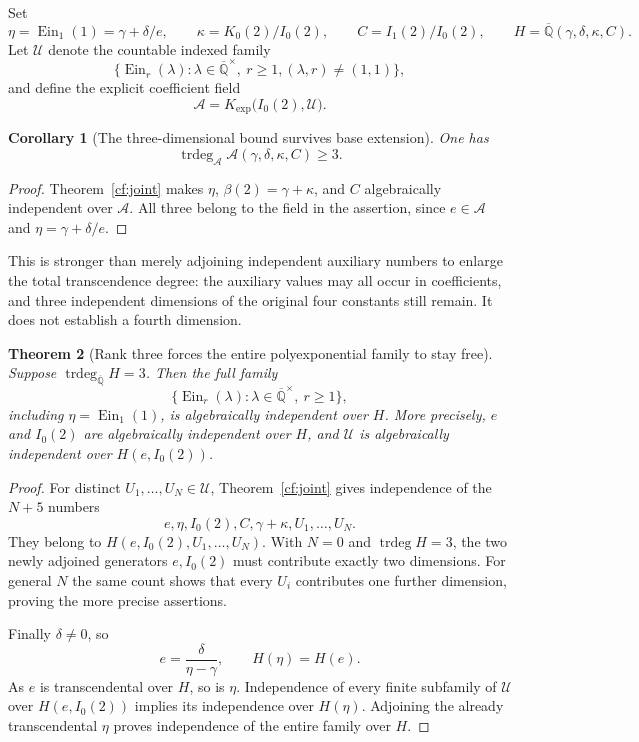 \documentclass[11pt]{article}
\newtheorem{theorem}{Theorem}[section]
\newtheorem{corollary}[theorem]{Corollary}
\theoremstyle{definition}
\theoremstyle{remark}
\newcommand{\Ein}{\operatorname{Ein}}
\begin{document}
Set
\[
 \eta=\Ein_1(1)=\gamma+\delta/e,\qquad
 \kappa=K_0(2)/I_0(2),\qquad C=I_1(2)/I_0(2),\qquad
 H=\overline{\mathbb Q}(\gamma,\delta,\kappa,C).
\]
Let $\mathcal U$ denote the countable indexed family
\[
 \{\Ein_r(\lambda):\lambda\in\overline{\mathbb Q}^{\times},\ r\ge1,
                         (\lambda,r)\ne(1,1)\},
\]
and define the explicit coefficient field
\[
 \mathcal A=K_{\exp}\bigl(I_0(2),\mathcal U\bigr).
\]
\begin{corollary}[The three-dimensional bound survives base extension]
\label{pj:largebase}
One has
\[
 \operatorname{trdeg}_{\mathcal A}
 \mathcal A(\gamma,\delta,\kappa,C)\ge3.
\]
\end{corollary}
\begin{proof}
Theorem~\ref{cf:joint} makes $\eta$, $\beta(2)=\gamma+\kappa$, and
$C$ algebraically independent over $\mathcal A$. All three belong to
the field in the assertion, since $e\in\mathcal A$ and
$\eta=\gamma+\delta/e$.
\end{proof}
This is stronger than merely adjoining independent auxiliary numbers
to enlarge the total transcendence degree: the auxiliary values may
all occur in coefficients, and three independent dimensions of the
original four constants still remain. It does not establish a fourth
dimension.

\begin{theorem}[Rank three forces the entire polyexponential family to stay free]
\label{pj:rankthree}
Suppose $\operatorname{trdeg}_{\overline{\mathbb Q}}H=3$. Then the full
family
\[
 \{\Ein_r(\lambda):\lambda\in\overline{\mathbb Q}^{\times},\ r\ge1\},
\]
\emph{including $\eta=\Ein_1(1)$}, is algebraically independent over $H$.
More precisely, $e$ and $I_0(2)$ are algebraically independent over $H$,
and $\mathcal U$ is algebraically independent over $H(e,I_0(2))$.
\end{theorem}
\begin{proof}
For distinct $U_1,\ldots,U_N\in\mathcal U$, Theorem~\ref{cf:joint}
gives independence of the $N+5$ numbers
\[
 e,\eta,I_0(2),C,\gamma+\kappa,U_1,\ldots,U_N.
\]
They belong to $H(e,I_0(2),U_1,\ldots,U_N)$. With $N=0$ and
$\operatorname{trdeg}H=3$, the two newly adjoined generators $e,I_0(2)$
must contribute exactly two dimensions. For general $N$ the same
count shows that every $U_i$ contributes one further dimension,
proving the more precise assertions.

Finally $\delta\ne0$, so
\[
 e=\frac{\delta}{\eta-\gamma},\qquad H(\eta)=H(e).
\]
As $e$ is transcendental over $H$, so is $\eta$. Independence of every
finite subfamily of $\mathcal U$ over $H(e,I_0(2))$ implies its
independence over $H(\eta)$. Adjoining the already transcendental
$\eta$ proves independence of the entire family over $H$.
\end{proof}
\end{document}
